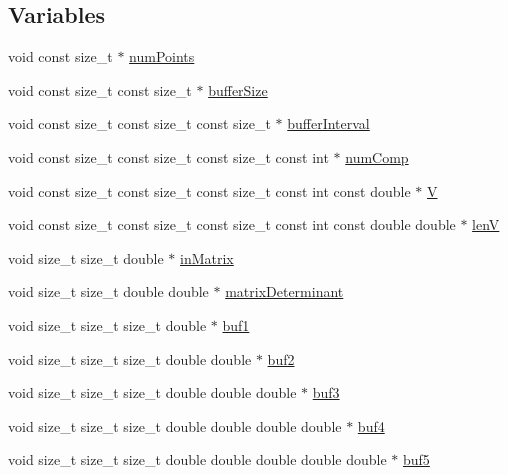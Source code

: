 \subsection*{Variables}
\begin{DoxyCompactItemize}
\item 
void const size\+\_\+t $\ast$ \hyperlink{SpecialKernels_8H_a759837aca0b634db3456eb90c861fd4a}{num\+Points}
\item 
void const size\+\_\+t const size\+\_\+t $\ast$ \hyperlink{SpecialKernels_8H_aa9426cdf16e85054db35e88f9b68c6be}{buffer\+Size}
\item 
void const size\+\_\+t const size\+\_\+t const size\+\_\+t $\ast$ \hyperlink{SpecialKernels_8H_ac88f8e4ac8e529a4c4130ede15896339}{buffer\+Interval}
\item 
void const size\+\_\+t const size\+\_\+t const size\+\_\+t const int $\ast$ \hyperlink{SpecialKernels_8H_a0ca5e89863a7ef42a6955add3ff97cae}{num\+Comp}
\item 
void const size\+\_\+t const size\+\_\+t const size\+\_\+t const int const double $\ast$ \hyperlink{SpecialKernels_8H_ac6b3e75b07df9bb98a9911c89819ba5a}{V}
\item 
void const size\+\_\+t const size\+\_\+t const size\+\_\+t const int const double double $\ast$ \hyperlink{SpecialKernels_8H_ae57c6618bb10bce0dd369e9611a363e2}{lenV}
\item 
void size\+\_\+t size\+\_\+t double $\ast$ \hyperlink{SpecialKernels_8H_aacec8fb16540ff8822123643cc0a8ac7}{in\+Matrix}
\item 
void size\+\_\+t size\+\_\+t double double $\ast$ \hyperlink{SpecialKernels_8H_a78525fd0fb580fe08dba21a167ba4ac1}{matrix\+Determinant}
\item 
void size\+\_\+t size\+\_\+t size\+\_\+t double $\ast$ \hyperlink{SpecialKernels_8H_a595273dc3902920c0056b8a1ef9bff5e}{buf1}
\item 
void size\+\_\+t size\+\_\+t size\+\_\+t double double $\ast$ \hyperlink{SpecialKernels_8H_ab3bc18ad1957d5cb9c2b612e89df900d}{buf2}
\item 
void size\+\_\+t size\+\_\+t size\+\_\+t double double double $\ast$ \hyperlink{SpecialKernels_8H_abcaabc21103d12066791d03652cf9d07}{buf3}
\item 
void size\+\_\+t size\+\_\+t size\+\_\+t double double double double $\ast$ \hyperlink{SpecialKernels_8H_aa0bc16bfee801837492416db85dff90c}{buf4}
\item 
void size\+\_\+t size\+\_\+t size\+\_\+t double double double double double $\ast$ \hyperlink{SpecialKernels_8H_a1d9b2cc88189869440b6641628dea8a9}{buf5}

\end{DoxyCompactItemize}
